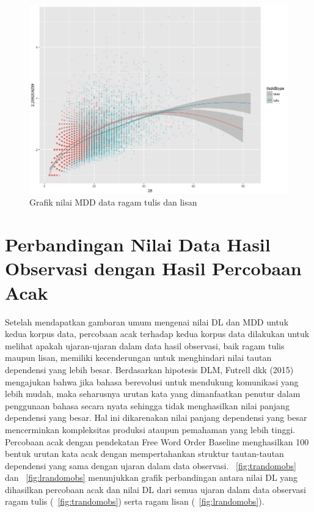 \begin{figure}
	\centering \includegraphics[width=1
	\textwidth] {pics/lisantulis_MDD.png} 
	\caption{Grafik nilai MDD data ragam tulis dan lisan} 
\label{fig:lisantulis_MDD} 
\end{figure}

\section{Perbandingan Nilai Data Hasil Observasi dengan Hasil Percobaan Acak}
Setelah mendapatkan gambaran umum mengenai nilai DL dan MDD untuk kedua korpus data, percobaan acak terhadap kedua korpus data dilakukan untuk melihat apakah ujaran-ujaran dalam data hasil observasi, baik ragam tulis maupun lisan, memiliki kecenderungan untuk menghindari nilai tautan dependensi yang lebih besar. Berdasarkan hipotesis DLM, Futrell dkk (2015) mengajukan bahwa jika bahasa berevolusi untuk mendukung komunikasi yang lebih mudah, maka seharusnya urutan kata yang dimanfaatkan penutur dalam penggunaan bahasa secara nyata sehingga tidak menghasilkan nilai panjang dependensi yang besar. Hal ini dikarenakan nilai panjang dependensi yang besar mencerminkan kompleksitas produksi ataupun pemahaman yang lebih tinggi. Percobaan acak dengan pendekatan Free Word Order Baseline menghasilkan 100 bentuk urutan kata acak dengan mempertahankan struktur tautan-tautan dependensi yang sama dengan ujaran dalam data observasi. \pic~\ref{fig:trandomobs} dan \pic~\ref{fig:lrandomobs} menunjukkan grafik perbandingan antara nilai DL yang dihasilkan percobaan acak dan nilai DL dari semua ujaran dalam data observasi ragam tulis (\pic~\ref{fig:trandomobs}) serta ragam lisan (\pic~\ref{fig:lrandomobs}). 

